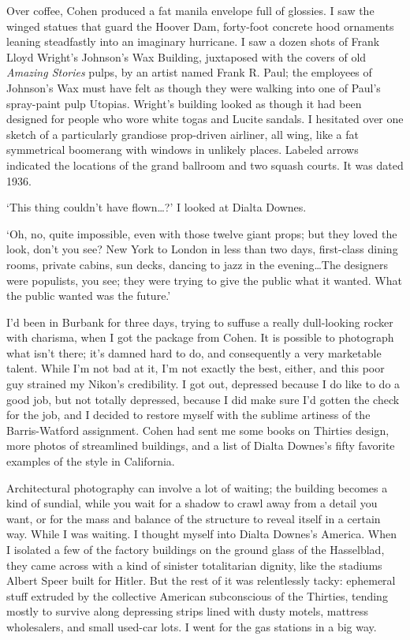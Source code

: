 Over coffee, Cohen produced a fat manila envelope full of glossies. I saw the winged statues that guard the Hoover Dam, forty-foot concrete hood ornaments leaning steadfastly into an imaginary hurricane. I saw a dozen shots of Frank Lloyd Wright's Johnson's Wax Building, juxtaposed with the covers of old \textit{Amazing Stories} pulps, by an artist named Frank R. Paul; the employees of Johnson's Wax must have felt as though they were walking into one of Paul's spray-paint pulp Utopias. Wright's building looked as though it had been designed for people who wore white togas and Lucite sandals. I hesitated over one sketch of a particularly grandiose prop-driven airliner, all wing, like a fat symmetrical boomerang with windows in unlikely places. Labeled arrows indicated the locations of the grand ballroom and two squash courts. It was dated 1936.

`This thing couldn't have flown\ldots?' I looked at Dialta Downes.

`Oh, no, quite impossible, even with those twelve giant props; but they loved the look, don't you see? New York to London in less than two days, first-class dining rooms, private cabins, sun decks, dancing to jazz in the evening\ldots The designers were populists, you see; they were trying to give the public what it wanted. What the public wanted was the future.'

I'd been in Burbank for three days, trying to suffuse a really dull-looking rocker with charisma, when I got the package from Cohen. It is possible to photograph what isn't there; it's damned hard to do, and consequently a very marketable talent. While I'm not bad at it, I'm not exactly the best, either, and this poor guy strained my Nikon's credibility. I got out, depressed because I do like to do a good job, but not totally depressed, because I did make sure I'd gotten the check for the job, and I decided to restore myself with the sublime artiness of the Barris-Watford assignment. Cohen had sent me some books on Thirties design, more photos of streamlined buildings, and a list of Dialta Downes's fifty favorite examples of the style in California.

Architectural photography can involve a lot of waiting; the building becomes a kind of sundial, while you wait for a shadow to crawl away from a detail you want, or for the mass and balance of the structure to reveal itself in a certain way. While I was waiting. I thought myself into Dialta Downes's America. When I isolated a few of the factory buildings on the ground glass of the Hasselblad, they came across with a kind of sinister totalitarian dignity, like the stadiums Albert Speer built for Hitler. But the rest of it was relentlessly tacky: ephemeral stuff extruded by the collective American subconscious of the Thirties, tending mostly to survive along depressing strips lined with dusty motels, mattress wholesalers, and small used-car lots. I went for the gas stations in a big way.


